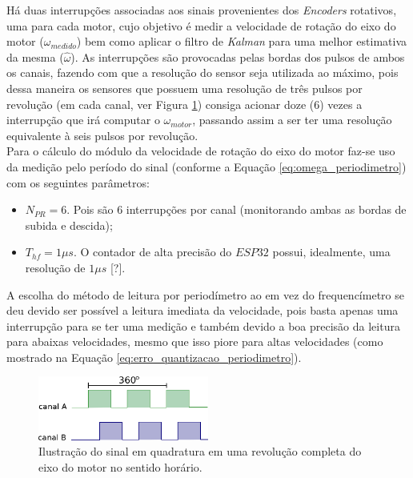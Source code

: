 Há duas interrupções associadas aos sinais provenientes dos \emph{Encoders} rotativos, uma para cada motor, cujo objetivo é medir a velocidade de rotação do eixo do motor ($\omega_{medido}$) bem como aplicar o filtro de \emph{Kalman} para uma melhor estimativa da mesma ($\hat{\omega}$). As interrupções são provocadas pelas bordas dos pulsos de ambos os canais, fazendo com que a resolução do sensor seja utilizada ao máximo, pois dessa maneira os sensores que possuem uma resolução de três pulsos por revolução (em cada canal, ver Figura \ref{fig:ilustracao_uma_revolucao}) consiga acionar doze ($6$) vezes a interrupção que irá computar o $\omega_{motor}$, passando assim a ser ter uma resolução equivalente à seis pulsos por revolução.\\

Para o cálculo do módulo da velocidade de rotação do eixo do motor faz-se uso da medição pelo período do sinal (conforme a Equação \ref{eq:omega_periodimetro}) com os seguintes parâmetros:

\begin{itemize}
    \item $N_{PR} = 6$. Pois são $6$ interrupções por canal (monitorando ambas as bordas de subida e descida);
    \item $T_{hf} = 1\mu{}s$. O contador de alta precisão do $ESP32$ possui, idealmente, uma resolução de $1\mu{}s$ [?].
\end{itemize}

A escolha do método de leitura por periodímetro ao em vez do frequencímetro se deu devido ser possível a leitura imediata da velocidade, pois basta apenas uma interrupção para se ter uma medição e também devido a boa precisão da leitura para abaixas velocidades, mesmo que isso piore para altas velocidades (como mostrado na Equação \ref{eq:erro_quantizacao_periodimetro}). 

\begin{figure}[H]
    \centering
    \includegraphics[width=0.5\textwidth]{figuras/ilustracoes/sinal_enquadratura_uma_revolucao.eps}
    \caption{Ilustração do sinal em quadratura em uma revolução completa do eixo do motor no sentido horário.}
    \label{fig:ilustracao_uma_revolucao}
\end{figure}

